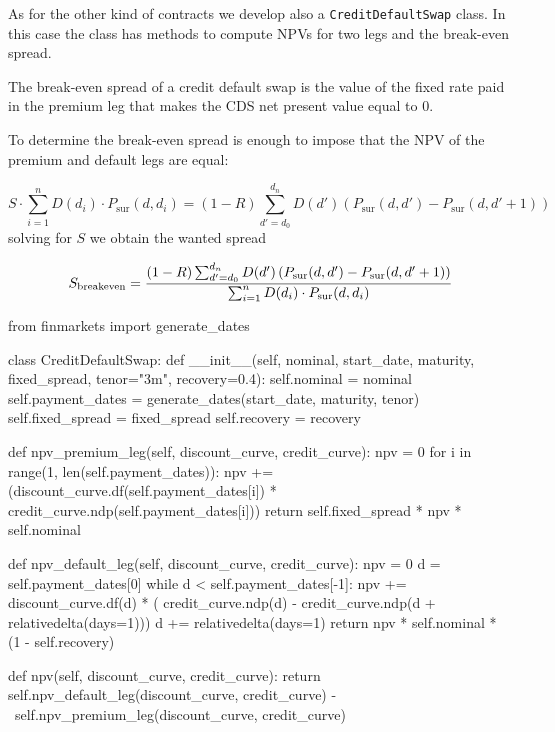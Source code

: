 \begin{finmarkets}
As for the other kind of contracts we develop also a \texttt{CreditDefaultSwap} class. In this case the class has methods to compute NPVs for two legs and the break-even spread.

The break-even spread of a credit default swap is the value of the fixed rate paid in the premium leg that makes the CDS net present value equal to 0.

To determine the break-even spread is enough to impose that the NPV of the premium and default legs are equal:

\begin{equation}
S \cdot\sum_{i=1}^{n} D(d_i) \cdot P_{\textrm{sur}}(d, d_i)
= (1-R) \sum_{d'=d_0}^{d_n} D(d') \left( P_{\textrm{sur}}(d, d') - P_{\textrm{sur}}(d, d'+1) \right)
\end{equation}
solving for $S$ we obtain the wanted spread

\begin{equation}
S_{\mathrm{breakeven}} = \cfrac{(1-R) \sum_{d'=d_0}^{d_n} D(d') \left( P_{\textrm{sur}}(d, d') - P_{\textrm{sur}}(d, d'+1) \right)}{\sum_{i=1}^{n} D(d_i) \cdot P_{\textrm{sur}}(d, d_i)}
\end{equation}
\end{finmarkets}

\begin{ipython}
from finmarkets import generate_dates

class CreditDefaultSwap:
    def __init__(self, nominal, start_date, maturity, fixed_spread,
                 tenor="3m", recovery=0.4):
        self.nominal = nominal
        self.payment_dates = generate_dates(start_date, maturity, tenor)
        self.fixed_spread = fixed_spread
        self.recovery = recovery

    def npv_premium_leg(self, discount_curve, credit_curve):
        npv = 0
        for i in range(1, len(self.payment_dates)):
            npv += (discount_curve.df(self.payment_dates[i]) *
                    credit_curve.ndp(self.payment_dates[i]))
        return self.fixed_spread * npv * self.nominal

    def npv_default_leg(self, discount_curve, credit_curve):
        npv = 0
        d = self.payment_dates[0]
        while d < self.payment_dates[-1]:
            npv += discount_curve.df(d) * (
                   credit_curve.ndp(d) -
                   credit_curve.ndp(d + relativedelta(days=1)))
            d += relativedelta(days=1)
        return npv * self.nominal * (1 - self.recovery)

    def npv(self, discount_curve, credit_curve):
        return self.npv_default_leg(discount_curve, credit_curve) - \
               self.npv_premium_leg(discount_curve, credit_curve)
\end{ipython}

